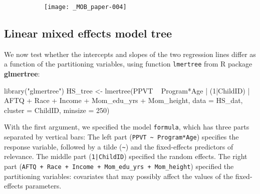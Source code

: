 \documentclass[doc,floatsintext,natbib]{apa7}
\begin{document}
\begin{figure}%
\caption{}
\begin{subfigure}{.7\textwidth}
\texttt{[image: \_MOB\_paper-004]}
\end{subfigure}
\label{fig:global_lmm}
\end{figure}%


\FloatBarrier
\subsection{Linear mixed effects model tree}

We now test whether the intercepts and slopes of the two regression lines differ as a function of the partitioning variables, using function \verb|lmertree| from R package \textbf{glmertree}:

\begin{Schunk}
\begin{Sinput}
 library("glmertree")
 HS_tree <- lmertree(PPVT ~ Program*Age | (1|ChildID) | AFTQ + Race + 
                       Income + Mom_edu_yrs + Mom_height, 
                     data = HS_dat, cluster = ChildID, minsize = 250)
\end{Sinput}
\end{Schunk}

With the first argument, we specified the model \verb|formula|, which has three parts separated by vertical bars: The left part (\verb|PPVT ~ Program*Age|) specifies the response variable, followed by a tilde (\verb|~|) and the fixed-effects predictors of relevance. The middle part (\texttt{1|ChildID}) specified the random effects. The right part (\verb|AFTQ + Race + Income + Mom_edu_yrs + Mom_height|) specified the partitioning variables: covariates that may possibly affect the values of the fixed-effects parameters. 
\end{document}
